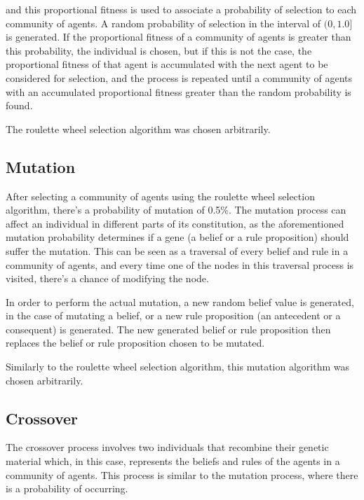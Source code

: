 and this proportional fitness is used to associate a probability of selection to
each community of agents. A random probability of selection in the interval of
$(0, 1.0]$ is generated. If the proportional fitness of a community of agents is
greater than this probability, the individual is chosen, but if this is not the
case, the proportional fitness of that agent is accumulated with the next agent
to be considered for selection, and the process is repeated until a community of
agents with an accumulated proportional fitness greater than the random
probability is found.

The roulette wheel selection algorithm was chosen arbitrarily. %


\subsection{Mutation}
\label{subsection:mutation}

After selecting a community of agents using the roulette wheel selection
algorithm, there's a probability of mutation of 0.5\%. The mutation process can
affect an individual in different parts of its constitution, as the
aforementioned mutation probability determines if a gene (a belief or a rule
proposition) should suffer the mutation. This can be seen as a traversal of
every belief and rule in a community of agents, and every time one of the nodes
in this traversal process is visited, there's a chance of modifying the node.

In order to perform the actual mutation, a new random belief value is generated,
in the case of mutating a belief, or a new rule proposition (an antecedent or a
consequent) is generated. The new generated belief or rule proposition then
replaces the belief or rule proposition chosen to be mutated.

Similarly to the roulette wheel selection algorithm, this mutation algorithm was
chosen arbitrarily.

\subsection{Crossover}
\label{subsection:crossover}

The crossover process involves two individuals that recombine their genetic
material which, in this case, represents the beliefs and rules of the agents in
a community of agents. This process is similar to the mutation process, where
there is a probability of occurring.


